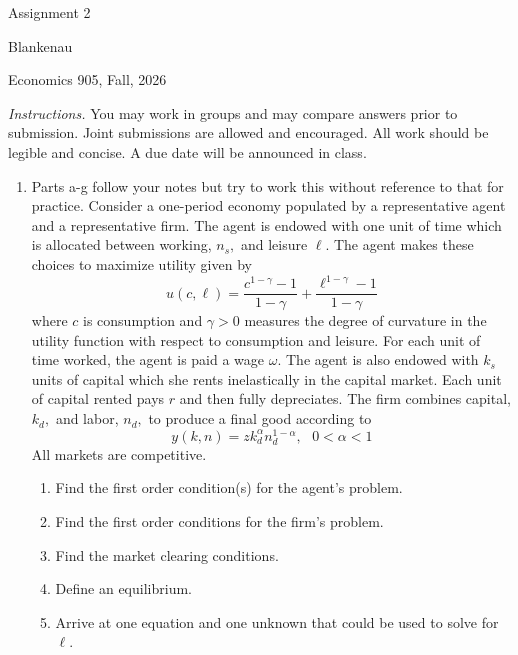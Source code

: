 \documentclass[11pt]{article}
\begin{document}
\begin{center}
{\LARGE Assignment 2}
\end{center}

\noindent Blankenau

\noindent Economics 905, Fall, 2026

\medskip
\noindent \textit{Instructions.} You may work in groups and may compare
answers prior to submission. Joint submissions are allowed and encouraged.
All work should be legible and concise. A due date will be announced in
class.

\begin{enumerate}
\item Parts a-g follow your notes but try to work this without reference to
that for practice. Consider a one-period economy populated by a
representative agent and a representative firm. The agent is endowed with
one unit of time which is allocated between working, $n_{s},$ and leisure $%
\ell $. The agent makes these choices to maximize utility given by 
\begin{equation*}
u\left( c,\ell \right) =\frac{c^{1-\gamma }-1}{1-\gamma }+\frac{\ell
^{1-\gamma }-1}{1-\gamma }
\end{equation*}%
where $c$ is consumption and $\gamma >0$ measures the degree of curvature in
the utility function with respect to consumption and leisure. For each unit
of time worked, the agent is paid a wage $\omega $. The agent is also
endowed with $k_{s}$ units of capital which she rents inelastically in the
capital market. Each unit of capital rented pays $r$ and then fully
depreciates. The firm combines capital, $k_{d},$ and labor, $n_{d},$ to
produce a final good according to 
\begin{equation}
y\left( k,n\right) =zk_{d}^{\alpha }n_{d}^{1-\alpha },\text{ }0<\alpha <1
\label{out}
\end{equation}%
All markets are competitive.

\begin{enumerate}
\item Find the first order condition(s) for the agent's problem.

\item Find the first order conditions for the firm's problem.

\item Find the market clearing conditions.

\item Define an equilibrium.

\item Arrive at one equation and one unknown that could be used to solve for 
$\ell .$


\end{enumerate}
\end{enumerate}
\end{document}
